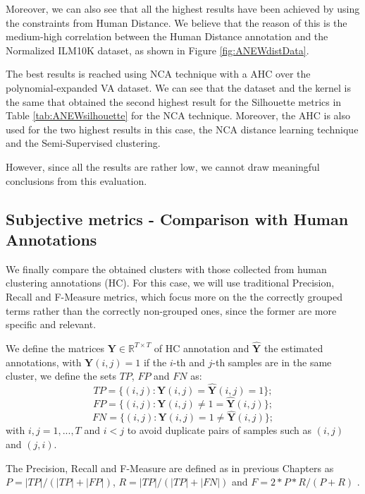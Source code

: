 Moreover, we can also see that all the highest results have been achieved by using the constraints from Human Distance. We believe that the reason of this is the medium-high correlation between the Human Distance annotation and the Normalized ILM10K dataset, as shown in Figure \ref{fig:ANEWdistData}.

The best results is reached using NCA technique with a AHC over the polynomial-expanded VA dataset. We can see that the dataset and the kernel is the same that obtained the second highest result for the Silhouette metrics in Table \ref{tab:ANEWsilhouette} for the NCA technique. Moreover, the AHC is also used for the two highest results in this case, the NCA distance learning technique and the Semi-Supervised clustering.

However, since all the results are rather low, we cannot draw meaningful conclusions from this evaluation.

\subsection{Subjective metrics - Comparison with Human Annotations}
\label{sec:ANEW:subHC_results}
We finally compare the obtained clusters with those collected from human clustering annotations (HC). For this case, we will use traditional Precision, Recall and F-Measure metrics, which focus more on the the correctly grouped terms rather than the correctly non-grouped ones, since the former are more specific and relevant.

We define the matrices $\mathbf{Y}\in \mathbb{R}^{T \times T}$ of HC annotation and $\hat{\mathbf{Y}}$ the estimated annotations, with $\mathbf{Y}(i,j)=1$ if the $i$-th and $j$-th samples are in the same cluster, we define the sets $TP$, $FP$ and $FN$ as:
\begin{equation}
TP=\{(i,j) : \mathbf{Y}(i,j)=\hat{\mathbf{Y}}(i,j)=1 \};
\end{equation}
\begin{equation}
FP=\{(i,j) : \mathbf{Y}(i,j)\neq 1=\hat{\mathbf{Y}}(i,j) \};
\end{equation}
\begin{equation}
FN=\{(i,j) : \mathbf{Y}(i,j)=1 \neq \hat{\mathbf{Y}}(i,j) \}; 
\end{equation}
with $i,j=1,...,T$ and  $i<j$ to avoid duplicate pairs of samples such as $(i,j)$ and $(j,i)$.

The Precision, Recall and F-Measure are defined as in previous Chapters as  $P= |TP|/(|TP|+|FP|) $, $R=|TP|/(|TP|+|FN|) $ and $F=2*P*R/(P+R)$ \cite{Manning2008}. 

